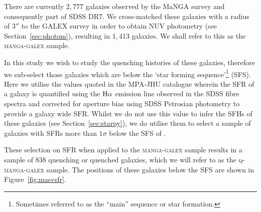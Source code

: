 \documentclass[useAMS,usenatbib]{mn2e}
\begin{document}
There are currently $2,777$ galaxies observed by the MaNGA survey and consequently part of SDSS DR7. We cross-matched these galaxies with a radius of $3''$ to the GALEX survey in order to obtain NUV photometry (see Section~\ref{sec:photom}), resulting in $1,413$ galaxies. We shall refer to this as the \textsc{manga-galex} sample. 

In this study we wish to study the quenching histories of these galaxies, therefore we sub-select those galaxies which are below the `star forming sequence'\footnote{Sometimes referred to as the ``main'' sequence or star formation.} (SFS). Here we utilise the values quoted in the MPA-JHU catalogue \citep{kauffmann03, brinchmann04} wherein the SFR of a galaxy is quantified using the $\rm{H}\alpha$ emission line observed in the SDSS fibre spectra and corrected for aperture bias using SDSS Petrosian photometry to provide a galaxy wide SFR. Whilst we do not use this value to infer the SFHs of these galaxies (see Section~\ref{sec:starpy}), we do utilise them to select a sample of galaxies with SFRs more than $1\sigma$ below the SFS of \cite{peng10}. 


These selection on SFR when applied to the \textsc{manga-galex} sample results in a sample of $838$ quenching or quenched galaxies, which we will refer to as the \textsc{q-manga-galex} sample. The positions of these galaxies below the SFS are shown in Figure~\ref{fig:masvsfr}. 
\end{document}
